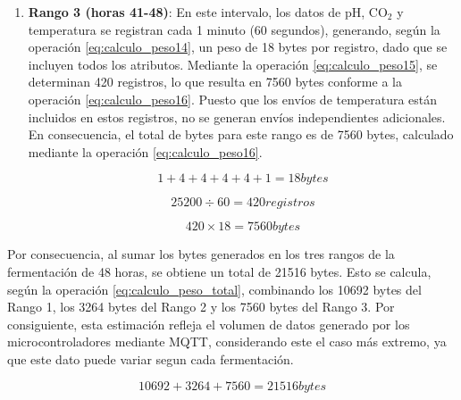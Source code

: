\begin{enumerate}
        \item \textbf{Rango 3 (horas 41-48)}: En este intervalo, los datos de pH,
        CO$_2$ y temperatura se registran cada 1 minuto (60 segundos), generando, 
        según la operación \ref{eq:calculo_peso14}, un peso de 18 bytes por registro, 
        dado que se incluyen todos los atributos. Mediante la operación 
        \ref{eq:calculo_peso15}, se determinan 420 registros, lo que resulta en 
        7560 bytes conforme a la operación \ref{eq:calculo_peso16}. Puesto que los 
        envíos de temperatura están incluidos en estos registros, no se generan envíos 
        independientes adicionales. En consecuencia, el total de bytes para este rango 
        es de 7560 bytes, calculado mediante la operación \ref{eq:calculo_peso16}.

        \begin{equation}
        1 + 4 + 4 + 4 + 4 + 1 = 18 bytes
        \label{eq:calculo_peso14}
        \end{equation}

        \begin{equation}
        25200 \div 60 = 420 registros
        \label{eq:calculo_peso15}
        \end{equation}

        \begin{equation}
        420 \times 18 = 7560 bytes
        \label{eq:calculo_peso16}
        \end{equation}

\end{enumerate}
Por consecuencia, al sumar los bytes generados en los tres rangos de la fermentación
de 48 horas, se obtiene un total de 21516 bytes. Esto se calcula, según la operación 
\ref{eq:calculo_peso_total}, combinando los 10692 bytes del Rango 1, los 3264 bytes del
Rango 2 y los 7560 bytes del Rango 3. Por consiguiente, esta estimación refleja el 
volumen de datos generado por los microcontroladores  mediante MQTT, considerando 
este el caso más extremo, ya que este dato puede variar segun cada fermentación.

\begin{equation}
10692 + 3264 + 7560 = 21516 bytes
\label{eq:calculo_peso_total}
\end{equation}

